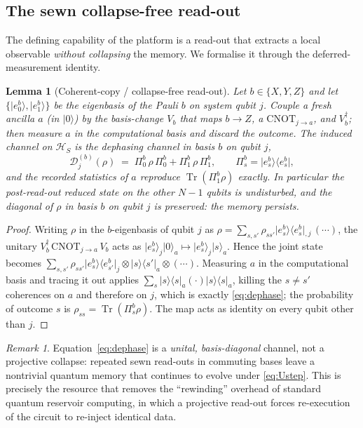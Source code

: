 \documentclass[11pt]{article}
\theoremstyle{plain}
\newtheorem{lemma}[theorem]{Lemma}
\theoremstyle{definition}
\theoremstyle{remark}
\newtheorem{remark}[theorem]{Remark}
\newcommand{\Tr}{\operatorname{Tr}}
\newcommand{\ket}[1]{\lvert #1 \rangle}
\newcommand{\bra}[1]{\langle #1 \rvert}
\newcommand{\proj}[1]{\lvert #1 \rangle\!\langle #1 \rvert}
\newcommand{\Hs}{\mathcal{H}}
\begin{document}
\subsection{The sewn collapse-free read-out}
The defining capability of the platform is a read-out that extracts a local observable \emph{without collapsing} the memory. We formalise it through the deferred-measurement identity.

\begin{lemma}[Coherent-copy / collapse-free read-out]\label{lem:sew}
Let $b\in\{X,Y,Z\}$ and let $\{\ket{e^b_0},\ket{e^b_1}\}$ be the eigenbasis of the Pauli $b$ on system qubit $j$. Couple a fresh ancilla $a$ (in $\ket 0$) by the basis-change $V_b$ that maps $b\to Z$, a $\mathrm{CNOT}_{j\to a}$, and $V_b^\dagger$; then measure $a$ in the computational basis and discard the outcome. The induced channel on $\Hs_S$ is the dephasing channel in basis $b$ on qubit $j$,
\begin{equation}
\mathcal{D}^{(b)}_j(\rho)\;=\;\Pi^b_0\,\rho\,\Pi^b_0+\Pi^b_1\,\rho\,\Pi^b_1,
\qquad \Pi^b_s=\proj{e^b_s},
\label{eq:dephase}
\end{equation}
and the recorded statistics of $a$ reproduce $\Tr(\Pi^b_1\rho)$ exactly. In particular the post-read-out reduced state on the \emph{other} $N-1$ qubits is undisturbed, and the diagonal of $\rho$ in basis $b$ on qubit $j$ is preserved: the memory persists.
\end{lemma}

\begin{proof}
Writing $\rho$ in the $b$-eigenbasis of qubit $j$ as $\rho=\sum_{s,s'}\rho_{ss'}\proj{e^b_s}\!{}_{,j}\,(\cdots)$, the unitary $V_b^\dagger\,\mathrm{CNOT}_{j\to a}\,V_b$ acts as $\ket{e^b_s}_j\ket0_a\mapsto\ket{e^b_s}_j\ket{s}_a$. Hence the joint state becomes $\sum_{s,s'}\rho_{ss'}\ket{e^b_s}\!\bra{e^b_{s'}}_j\otimes\ket s\!\bra{s'}_a\otimes(\cdots)$. Measuring $a$ in the computational basis and tracing it out applies $\sum_s\proj{s}_a(\cdot)\proj{s}_a$, killing the $s\neq s'$ coherences on $a$ and therefore on $j$, which is exactly \eqref{eq:dephase}; the probability of outcome $s$ is $\rho_{ss}=\Tr(\Pi^b_s\rho)$. The map acts as identity on every qubit other than $j$. \end{proof}

\begin{remark}
Equation~\eqref{eq:dephase} is a \emph{unital, basis-diagonal} channel, not a projective collapse: repeated sewn read-outs in commuting bases leave a nontrivial quantum memory that continues to evolve under \eqref{eq:Ustep}. This is precisely the resource that removes the ``rewinding'' overhead of standard quantum reservoir computing, in which a projective read-out forces re-execution of the circuit to re-inject identical data.
\end{remark}
\end{document}
